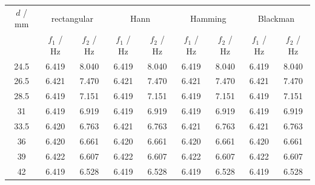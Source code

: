 \begin{tabular}{@{}ccccccccc@{}}
\toprule
$d$ / mm & \multicolumn{2}{c}{rectangular} & \multicolumn{2}{c}{Hann} & \multicolumn{2}{c}{Hamming} & \multicolumn{2}{c}{Blackman} \\
 & $f_1$ / Hz & $f_2$ / Hz & $f_1$ / Hz & $f_2$ / Hz & $f_1$ / Hz & $f_2$ / Hz & $f_1$ / Hz & $f_2$ / Hz \\
\midrule
24.5 & 6.419 & 8.040 & 6.419 & 8.040 & 6.419 & 8.040 & 6.419 & 8.040 \\
26.5 & 6.421 & 7.470 & 6.421 & 7.470 & 6.421 & 7.470 & 6.421 & 7.470 \\
28.5 & 6.419 & 7.151 & 6.419 & 7.151 & 6.419 & 7.151 & 6.419 & 7.151 \\
31 & 6.419 & 6.919 & 6.419 & 6.919 & 6.419 & 6.919 & 6.419 & 6.919 \\
33.5 & 6.420 & 6.763 & 6.421 & 6.763 & 6.421 & 6.763 & 6.421 & 6.763 \\
36 & 6.420 & 6.661 & 6.420 & 6.661 & 6.420 & 6.661 & 6.420 & 6.661 \\
39 & 6.422 & 6.607 & 6.422 & 6.607 & 6.422 & 6.607 & 6.422 & 6.607 \\
42 & 6.419 & 6.528 & 6.419 & 6.528 & 6.419 & 6.528 & 6.419 & 6.528 \\
\bottomrule
\end{tabular}